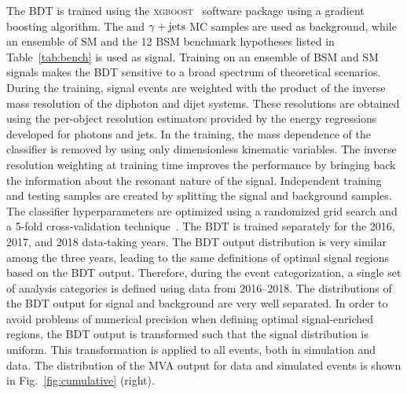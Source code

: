 \documentclass[11pt,twoside,a4paper,cmspaper,final,collab]{cms-tdr}
\begin{document}
The BDT is trained using the \textsc{xgboost}~\cite{xgboost} software package using a gradient boosting algorithm.
The \DIPHO and $\gamma+\text{jets}$ MC samples are used as background, while an ensemble of SM \HH and the 12 BSM \HH benchmark hypotheses listed in Table~\ref{tab:bench} is used as signal. Training on an ensemble of BSM and SM \HH signals makes the BDT sensitive to a broad spectrum of theoretical scenarios. During the training, signal
events are weighted with the product of the inverse mass resolution of the diphoton and dijet systems. These resolutions are obtained using the per-object
resolution estimators provided by the energy regressions developed for photons and {\cPqb} jets. 
In the training, the mass dependence of the classifier is removed by using only dimensionless kinematic variables.
The inverse resolution weighting at
training time improves the performance by bringing back the information about the resonant nature of the signal.
Independent training and testing samples are created
by splitting the signal and background samples. The classifier hyperparameters are optimized using a randomized grid search and a 5-fold cross-validation technique~\cite{Hastie}. The BDT is trained separately for the 2016, 2017, and 2018 data-taking years.
 The BDT output distribution is very similar among the three years, leading to the same definitions of optimal signal regions based on the BDT output. Therefore, during the event categorization, a single set of analysis categories is defined using data from 2016--2018.
The distributions of the BDT output for signal and background are very well separated. In order to avoid problems of numerical precision when defining optimal signal-enriched regions, the BDT output is transformed such that the signal distribution is uniform. This transformation is applied to all events, both in simulation
and data. The distribution of the MVA output for data and simulated events is shown in Fig.~\ref{fig:cumulative} (right). 
\end{document}
